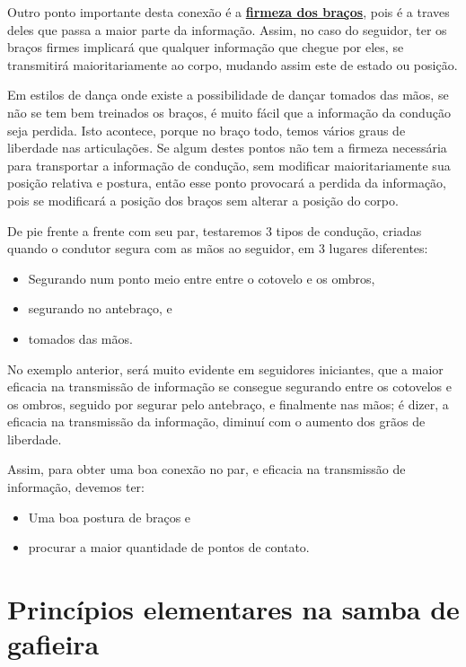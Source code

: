 \begin{description}
Outro ponto importante desta conexão é a \hyperref[def:brazosfirmes]{\textbf{firmeza dos braços}}, 
pois é a traves deles que passa a maior parte da informação.
Assim, no caso do seguidor, ter os braços firmes implicará que qualquer informação que chegue por eles,
se transmitirá maioritariamente ao corpo,
mudando assim este de estado ou posição.

Em estilos de dança onde existe a possibilidade de dançar tomados das mãos,
se não se tem bem treinados os braços,
é muito fácil que a informação da condução seja perdida.
Isto acontece, porque no braço todo, temos vários graus de liberdade nas articulações.
Se algum destes pontos não tem a firmeza necessária para transportar a informação de condução, 
sem modificar maioritariamente sua posição relativa e postura,  
então esse ponto provocará a perdida da informação, 
pois se modificará a posição dos braços sem alterar a posição do corpo.
\begin{example}
De pie frente a frente com seu par, testaremos 3 tipos de condução, 
criadas quando o condutor segura com as mãos ao seguidor, em 3 lugares diferentes:
\begin{itemize}
\item Segurando num ponto meio entre entre o cotovelo e os ombros,
\item segurando no antebraço, e
\item tomados das mãos.
\end{itemize}
\end{example}
No exemplo anterior, será muito evidente em seguidores iniciantes,
que a maior eficacia na transmissão de informação se consegue segurando entre os cotovelos e os ombros,
seguido por segurar pelo antebraço, e finalmente nas mãos;
é dizer, a eficacia na transmissão da informação, 
diminuí com o aumento dos grãos de liberdade.

Assim, para obter uma boa conexão no par, 
e eficacia na transmissão de informação, devemos ter:
\begin{itemize}
\item Uma boa postura de braços e
\item procurar a maior quantidade de pontos de contato.
\end{itemize}  

\end{description}

\section{Princípios elementares na samba de gafieira}
\label{sec:principiosambagafieira}

